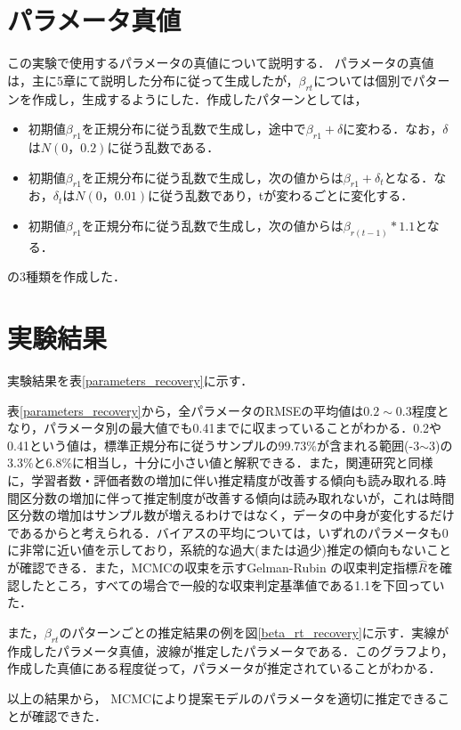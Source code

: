 \documentclass[a4paper,11pt,oneside,openany]{jsbook}
\begin{document}
\section{パラメータ真値}
この実験で使用するパラメータの真値について説明する．
パラメータの真値は，主に5章にて説明した分布に従って生成したが，$\beta_{rt}$については個別でパターンを作成し，生成するようにした．作成したパターンとしては，
\begin{itemize}
\item 初期値$\beta_{r1}$を正規分布に従う乱数で生成し，途中で$\beta_{r1}+\delta$に変わる．なお，$\delta$は$N(0，0.2)$に従う乱数である．
\item 初期値$\beta_{r1}$を正規分布に従う乱数で生成し，次の値からは$\beta_{r1}+\delta_t$となる．なお，$\delta_t$は$N(0，0.01)$に従う乱数であり，tが変わるごとに変化する．
\item 初期値$\beta_{r1}$を正規分布に従う乱数で生成し，次の値からは$\beta_{r(t-1)}*1.1$となる．
\end{itemize}
の3種類を作成した．
\section{実験結果}
実験結果を表\ref{parameters_recovery}に示す．

表\ref{parameters_recovery}から，全パラメータのRMSEの平均値は$0.2\sim0.3$程度となり，パラメータ別の最大値でも0.41までに収まっていることがわかる．0.2や0.41という値は，標準正規分布に従うサンプルの99.73\%が含まれる範囲(-3$\sim$3)の3.3\%と6.8\%に相当し，十分に小さい値と解釈できる．また，関連研究と同様に，学習者数・評価者数の増加に伴い推定精度が改善する傾向も読み取れる.時間区分数の増加に伴って推定制度が改善する傾向は読み取れないが，これは時間区分数の増加はサンプル数が増えるわけではなく，データの中身が変化するだけであるからと考えられる．バイアスの平均については，いずれのパラメータも0に非常に近い値を示しており，系統的な過大(または過少)推定の傾向もないことが確認できる．また，MCMCの収束を示すGelman-Rubin の収束判定指標$ \hat{R} $\cite{RhatRubin,RhatCarlin}を確認したところ，すべての場合で一般的な収束判定基準値である1.1を下回っていた．

また，$\beta_{rt}$のパターンごとの推定結果の例を図\ref{beta_rt_recovery}に示す．実線が作成したパラメータ真値，波線が推定したパラメータである．このグラフより，作成した真値にある程度従って，パラメータが推定されていることがわかる．

以上の結果から， MCMCにより提案モデルのパラメータを適切に推定できることが確認できた．
\end{document}
